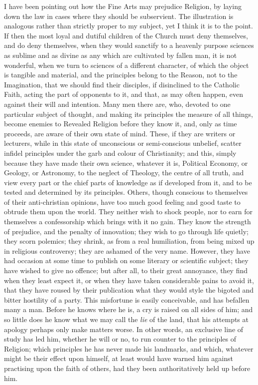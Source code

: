 I have been pointing out how the Fine Arts may prejudice Religion,
by laying down the law in cases where they should be subservient. The
illustration is analogous rather than strictly proper to my subject,
yet I think it is to the point. If then the most loyal and dutiful
children of the Church must deny themselves, and do deny themselves,
when they would sanctify to a heavenly purpose sciences as sublime and
as divine as any which are cultivated by fallen man, it is not
wonderful, when we turn to sciences of a different character, of which
the object is tangible and material, and the principles belong to the
Reason, not to the Imagination, that we should find their disciples,
if disinclined to the Catholic Faith, acting the part of opponents to
it, and that, as may often happen, even against their will and
intention. Many men there are, who, devoted to one particular subject
of thought, and making its principles the measure of all things,
become enemies to Revealed Religion before they know it, and, only as
time proceeds, are aware of their own state of mind. These, if they
are writers or lecturers, while in this state of unconscious or
semi-conscious unbelief, scatter infidel principles under the garb and
colour of Christianity; and this, simply because they have made their
own science, whatever it is, Political Economy, or Geology, or
Astronomy, to the neglect of Theology, the centre of all truth, and
view every part or the chief parts of knowledge as if developed from
it, and to be tested and determined by its principles. Others, though
conscious to themselves of their anti-christian opinions, have too
much good feeling and good taste to obtrude them upon the world.
They neither wish to shock people, nor to earn for themselves a
confessorship which brings with it no gain. They know the strength of
prejudice, and the penalty of innovation; they wish to go through life
quietly; they scorn polemics; they shrink, as from a real humiliation,
from being mixed up in religious controversy; they are ashamed of the
very name. However, they have had occasion at some time to publish on
some literary or scientific subject; they have wished to give no
offence; but after all, to their great annoyance, they find when they
least expect it, or when they have taken considerable pains to avoid
it, that they have roused by their publication what they would style
the bigoted and bitter hostility of a party. This misfortune is easily
conceivable, and has befallen many a man. Before he knows where he is,
a cry is raised on all sides of him; and so little does he know what we
may call the \emph{lie} of the land, that his attempts at apology
perhaps only make matters worse. In other words, an exclusive line of
study has led him, whether he will or no, to run counter to the
principles of Religion; which principles he has never made his
landmarks, and which, whatever might be their effect upon himself, at
least would have warned him against practising upon the faith of
others, had they been authoritatively held up before him.

